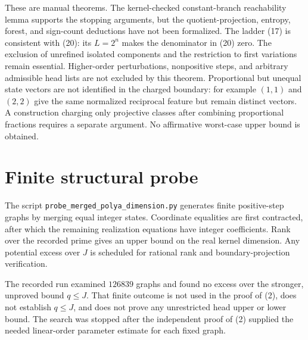 \documentclass[11pt]{article}
\begin{document}
These are manual theorems. The kernel-checked constant-branch reachability
lemma supports the stopping arguments, but the quotient-projection,
entropy, forest, and sign-count deductions have not been formalized.
The ladder (17) is consistent with (20): its $L=2^n$ makes the
denominator in (20) zero. The exclusion of unrefined isolated components
and the restriction to first variations remain essential. Higher-order
perturbations, nonpositive steps, and arbitrary admissible head lists
are not excluded by this theorem. Proportional but unequal state vectors
are not identified in the charged boundary: for example $(1,1)$ and
$(2,2)$ give the same normalized reciprocal feature but remain distinct
vectors. A construction charging only projective classes after combining
proportional fractions requires a separate argument. No affirmative
worst-case upper bound is obtained.

\section{Finite structural probe}

The script \texttt{probe\_merged\_polya\_dimension.py} generates
finite positive-step graphs by merging equal integer states. Coordinate
equalities are first contracted, after which the remaining realization
equations have integer coefficients. Rank over the recorded prime gives
an upper bound on the real kernel dimension. Any potential excess over
$J$ is scheduled for rational rank and boundary-projection verification.

The recorded run examined $126839$ graphs and found no excess over
the stronger, unproved bound $q\le J$. That finite outcome is not
used in the proof of (2), does not establish $q\le J$, and does not
prove any unrestricted head upper or lower bound. The search was
stopped after the independent proof of (2) supplied the needed
linear-order parameter estimate for each fixed graph.
\end{document}
